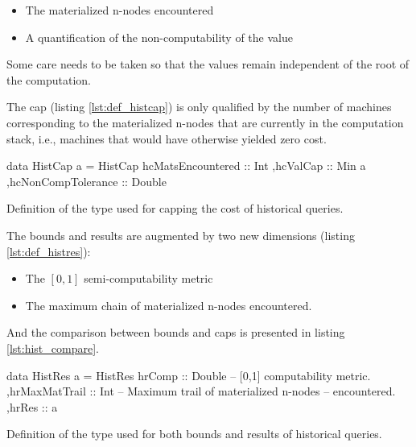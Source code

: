 \begin{itemize}
\item The materialized n-nodes encountered
\item A quantification of the non-computability of the value
\end{itemize}

Some care needs to be taken so that the values remain independent of
the root of the computation.

The cap (listing \ref{lst:def_histcap}) is only qualified by the number of
machines corresponding to the materialized n-nodes that are currently in the
computation stack, i.e., machines that would have otherwise yielded
zero cost.

\begin{code}
\begin{haskellcode}
data HistCap a =
  HistCap
  { hcMatsEncountered :: Int
   ,hcValCap :: Min a
   ,hcNonCompTolerance :: Double
  }
\end{haskellcode}
  \caption{\label{lst:def_histcap}Definition of the type used for
    capping the cost of historical queries.}
\end{code}

The bounds and results are augmented by two new dimensions (listing
\ref{lst:def_histres}):

\begin{itemize}
\item The \([0,1]\) semi-computability metric
\item The maximum chain of materialized n-nodes encountered.
\end{itemize}

And the comparison between bounds and caps is presented in listing
\ref{lst:hist_compare}.

\begin{code}
\begin{haskellcode}
data HistRes a =
  HistRes
  { hrComp :: Double  -- [0,1] computability metric.
   ,hrMaxMatTrail :: Int -- Maximum trail of materialized n-nodes
                         -- encountered.
   ,hrRes :: a
  }
\end{haskellcode}
  \caption{\label{lst:def_histres}Definition of the type used for both
    bounds and results of historical queries.}
\end{code}


